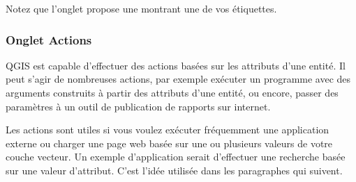 Notez que l'onglet  propose une  montrant une de vos étiquettes.

\subsubsection{Onglet Actions}\label{label_actions}

QGIS est capable d'effectuer des actions basées sur les attributs d'une entité. Il peut s'agir de nombreuses actions, par exemple exécuter un programme avec des arguments construits à partir des attributs d'une entité, ou encore, passer des paramètres à un outil de publication de rapports sur internet.

Les actions sont utiles si vous voulez exécuter fréquemment une application externe ou charger une page web basée sur une ou plusieurs valeurs de votre couche vecteur. Un exemple d'application serait d'effectuer une recherche basée sur une valeur d'attribut. C'est l'idée utilisée dans les paragraphes qui suivent.


